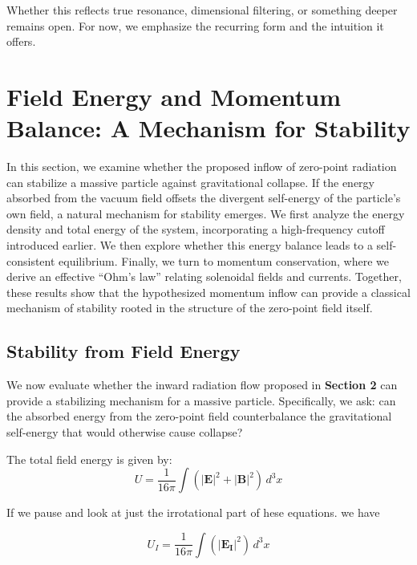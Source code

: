 \documentclass {article}
\renewcommand\vec{\mathbf}
\begin{document}
Whether this reflects true resonance, dimensional filtering, or something deeper remains open.  For now, we emphasize the recurring form and the intuition it offers.





\section{Field Energy and Momentum Balance: A Mechanism for Stability}
\label{sec:stability}



In this section, we examine whether the proposed inflow of zero-point radiation can stabilize a massive particle against gravitational collapse. If the energy absorbed from the vacuum field offsets the divergent self-energy of the particle’s own field, a natural mechanism for stability emerges. We first analyze the energy density and total energy of the system, incorporating a high-frequency cutoff introduced earlier. We then explore whether this energy balance leads to a self-consistent equilibrium. Finally, we turn to momentum conservation, where we derive an effective “Ohm’s law” relating solenoidal fields and currents. Together, these results show that the hypothesized momentum inflow can provide a classical mechanism of stability rooted in the structure of the zero-point field itself.

\subsection{Stability from Field Energy}

We now evaluate whether the inward radiation flow proposed in \textbf{Section 2} can provide a stabilizing mechanism for a massive particle. Specifically, we ask: can the absorbed energy from the zero-point field counterbalance the gravitational self-energy that would otherwise cause collapse?

The total field energy is given by:
\begin{equation}
U = \frac{1}{16\pi} \int \left( |\vec{E}|^2 + |\vec{B}|^2 \right) \, d^3x
\end{equation}

If we pause and look at just the irrotational part of hese equations. we have

\begin{equation}
U_I = \frac{1}{16\pi} \int \left( |\vec{E_I}|^2  \right) \, d^3x
\end{equation}
\end{document}
